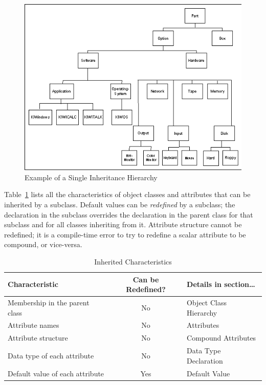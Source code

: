\begin{figure}[h]
  \centering
  \includegraphics[scale=0.7]{f2-1}
  \caption{Example of a Single Inheritance Hierarchy}
  \label{f:2-1}
\end{figure}

Table~\ref{t:inchar} lists all the characteristics of object classes and
attributes that can be inherited by a subclass. Default
values can be \emph{redefined} by a subclass; the declaration in the
subclass overrides the declaration in the parent class for
that subclass and for all classes inheriting from it.
Attribute structure cannot be redefined; it is a compile-time
error to try to redefine a scalar attribute to be compound,
or vice-versa.
\begin{table}[h]
  \begin{tabularx}{\columnwidth}{Xcl}
    \toprule
    Characteristic              & Can be Redefined?      & Details in section\ldots   \\
    \midrule
    Membership in the parent class    & No          & Object Class Hierarchy \\
    Attribute names             & No          & Attributes   \\
    Attribute structure         & No          & Compound Attributes     \\
    Data type of each attribute & No          & Data Type Declaration    \\
    Default value of each attribute       & Yes         & Default Value \\
    \bottomrule
  \end{tabularx}
  \caption{Inherited Characteristics}
  \label{t:inchar}
\end{table}  

